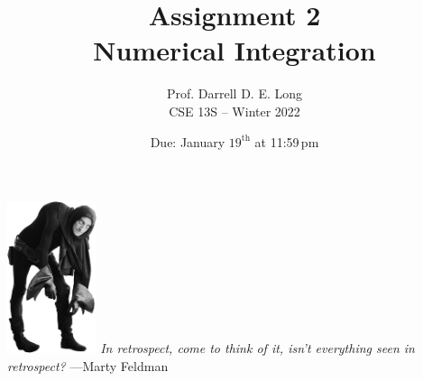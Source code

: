\documentclass[11pt,multicol]{article}
\title{Assignment 2 \\ Numerical Integration}
\author{
  Prof.\xspace Darrell D.\xspace E.\xspace Long \\
  CSE 13S -- Winter 2022
}
\date{Due: January $19^\text{th}$  at 11:59\,pm}
\begin{document}
\maketitle












\vfill\begin{center}
\includegraphics[height=1.75in]{images/marty-igor.png}
\emph{In retrospect, come to think of it, isn't everything seen in retrospect?}
---Marty Feldman
\end{center}
\end{document}
